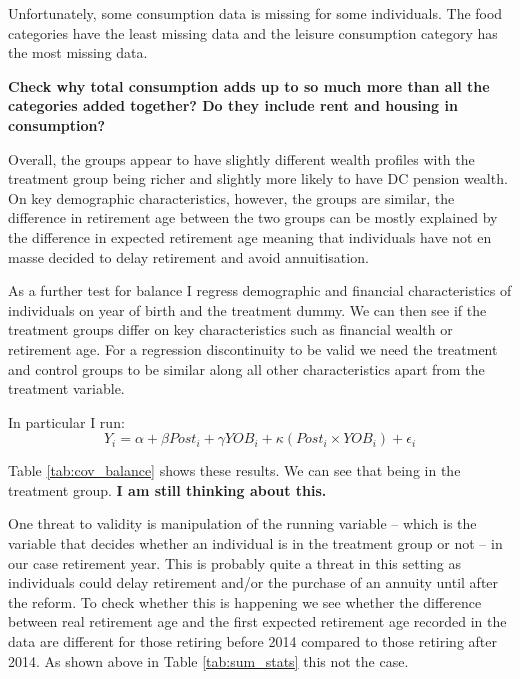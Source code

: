\documentclass[12pt]{article}
\begin{document}
Unfortunately, some consumption data is missing for some individuals. The food categories have the least missing data
and the leisure consumption category has the most missing data.

\textbf{Check why total consumption adds up to so much
    more than all the categories added together? Do they include rent and housing in consumption?}


Overall, the groups appear to have slightly different wealth profiles with the treatment group being richer and slightly more likely
to have DC pension wealth. On key demographic characteristics, however, the groups are similar, the difference in retirement
age between the two groups can be mostly explained by the difference in expected retirement age meaning that individuals
have not en masse decided to delay retirement and avoid annuitisation.



\begin{landscape}

    

\end{landscape}


As a further test for balance I regress demographic and financial characteristics of individuals on year of birth and the treatment dummy.
We can then see if the treatment groups differ on key characteristics such as financial wealth or retirement age.
For a regression discontinuity to be valid we need the treatment and control groups to be similar along
all other characteristics apart from the treatment variable.

In particular I run:
\begin{equation*}
    Y_{i} = \alpha + \beta Post_{i} + \gamma YOB_{i} + \kappa (Post_{i} \times YOB_{i}) + \epsilon_{i}
\end{equation*}



Table \ref{tab:cov_balance} shows these results. We can see that being in the treatment group.
\textbf{I am still thinking about this.}


One threat to validity is manipulation of the running variable -- which is the variable that decides
whether an individual is in the treatment group or not -- in our case retirement year.
This is probably quite a threat in this setting as individuals could delay retirement and/or
the purchase of an annuity until after the reform. To check whether
this is happening we see whether the difference between real retirement age and the first expected retirement age
recorded in the data are different for those retiring before 2014 compared to those retiring after 2014. As shown
above in Table \ref{tab:sum_stats} this not the case.
\end{document}
